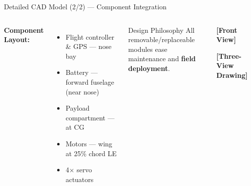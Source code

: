 \documentclass[aspectratio=169,11pt]{beamer}
\begin{document}
\begin{frame}{Detailed CAD Model (2/2) — Component Integration}

\begin{columns}[T]

  \textbf{\color{navymain}Component Layout:}
  \begin{itemize}\setlength\itemsep{3pt}
    \item Flight controller \& GPS — nose bay
    \item Battery — forward fuselage (near nose)
    \item Payload compartment — at CG
    \item Motors — wing at 25\% chord LE
    \item 4$\times$ servo actuators
  \end{itemize}

  \vspace{0.5cm}
  \begin{block}{Design Philosophy}
    All removable/replaceable modules ease\\
    maintenance and \textbf{field deployment}.
  \end{block}

  \begin{center}
    \colorbox{iceblue}{\parbox{0.92\linewidth}{%
      \centering\vspace{30pt}
      \textcolor{navymain}{\small\textbf{[Front View]}}
      \vspace{30pt}
    }}
    \vspace{0.2cm}
    \colorbox{iceblue}{\parbox{0.92\linewidth}{%
      \centering\vspace{28pt}
      \textcolor{navymain}{\small\textbf{[Three-View Drawing]}}
      \vspace{28pt}
    }}
  \end{center}

\end{columns}
\end{frame}
\end{document}
